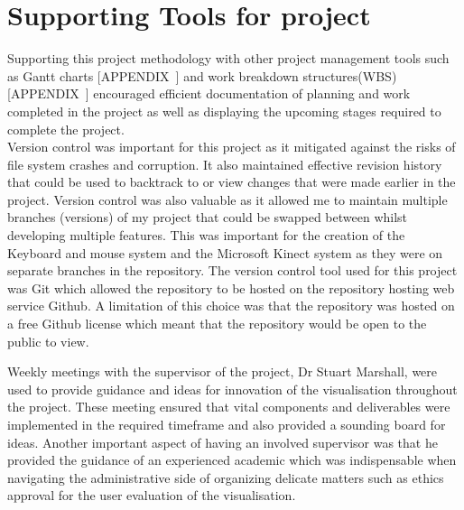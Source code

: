 \section{Supporting Tools for project}
Supporting this project methodology with other project management tools such
as Gantt charts [APPENDIX~] and work breakdown structures(WBS) [APPENDIX~]
encouraged efficient documentation of planning and work completed in the project
as well as displaying the upcoming stages required to complete the project.
\\

Version control was important for this project as it mitigated against the risks
of file system crashes and corruption. It also maintained effective revision
history that could be used to backtrack to or view changes that were made
earlier in the project. Version control was also valuable as it allowed me to
maintain multiple branches (versions) of my project that could be swapped between whilst developing multiple features.
This was important for the creation of the Keyboard and mouse system and the
Microsoft Kinect system as they were on separate branches in the repository. 
The version control tool used for this project was Git which allowed
 the repository to be hosted on the repository hosting web service Github. A
limitation of this choice was that the repository was hosted on a free Github license which meant that the
repository would be open to the public to view.

Weekly meetings with the supervisor of the project, Dr Stuart Marshall, were
used to provide guidance and ideas for innovation of the visualisation
throughout the project. These meeting ensured that vital components and
deliverables were implemented in the required timeframe and also provided a
sounding board for ideas.
Another important aspect of having an involved supervisor was that he provided the guidance of an experienced academic which was indispensable when
navigating the administrative side of organizing delicate matters such as ethics
approval for the user evaluation of the visualisation.
